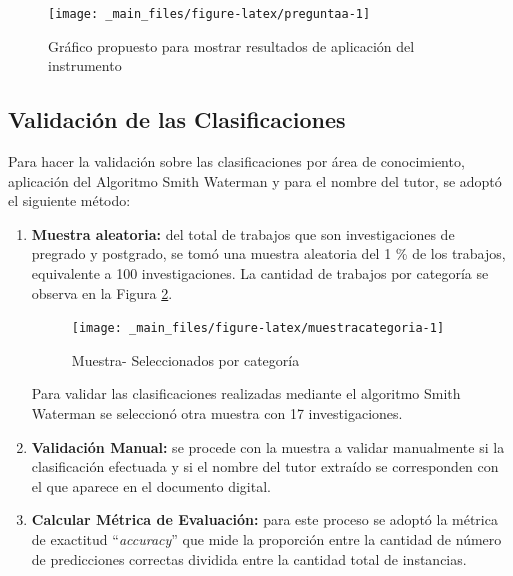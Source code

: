 \documentclass[
  12pt,
  openany]{book}
\begin{document}
\begin{figure}

{\centering \texttt{[image: \_main\_files/figure-latex/preguntaa-1]} 

}

\caption{Gráfico propuesto para mostrar resultados de aplicación del instrumento}\label{fig:preguntaa}
\end{figure}

\hypertarget{validaciuxf3n-de-las-clasificaciones}{%
\subsection{Validación de las Clasificaciones}\label{validaciuxf3n-de-las-clasificaciones}}

Para hacer la validación sobre las clasificaciones por área de conocimiento, aplicación del Algoritmo Smith Waterman y para el nombre del tutor, se adoptó el siguiente método:

\begin{enumerate}
\def\labelenumi{\arabic{enumi}.}
\item
  \textbf{Muestra aleatoria:} del total de trabajos que son investigaciones de pregrado y postgrado, se tomó una muestra aleatoria del 1 \% de los trabajos, equivalente a 100 investigaciones. La cantidad de trabajos por categoría se observa en la Figura \ref{fig:muestracategoria}.

  \begin{figure}

  {\centering \texttt{[image: \_main\_files/figure-latex/muestracategoria-1]} 

  }

  \caption{Muestra- Seleccionados por categoría}\label{fig:muestracategoria}
  \end{figure}

  Para validar las clasificaciones realizadas mediante el algoritmo Smith Waterman se seleccionó otra muestra con 17 investigaciones.
\item
  \textbf{Validación Manual:} se procede con la muestra a validar manualmente si la clasificación efectuada y si el nombre del tutor extraído se corresponden con el que aparece en el documento digital.
\item
  \textbf{Calcular Métrica de Evaluación:} para este proceso se adoptó la métrica de exactitud ``\emph{accuracy}'' que mide la proporción entre la cantidad de número de predicciones correctas dividida entre la cantidad total de instancias.
\end{enumerate}
\end{document}
